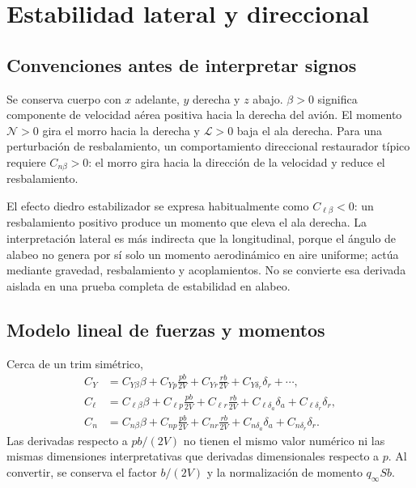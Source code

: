 \chapter{Estabilidad lateral y direccional}\label{ch:lat-static}

\section{Convenciones antes de interpretar signos}
Se conserva cuerpo con $x$ adelante, $y$ derecha y $z$ abajo. $\beta>0$ significa componente de velocidad aérea positiva hacia la derecha del avión. El momento $\mathcal N>0$ gira el morro hacia la derecha y $\mathcal L>0$ baja el ala derecha. Para una perturbación de resbalamiento, un comportamiento direccional restaurador típico requiere $C_{n\beta}>0$: el morro gira hacia la dirección de la velocidad y reduce el resbalamiento.

El efecto diedro estabilizador se expresa habitualmente como $C_{\ell\beta}<0$: un resbalamiento positivo produce un momento que eleva el ala derecha. La interpretación lateral es más indirecta que la longitudinal, porque el ángulo de alabeo no genera por sí solo un momento aerodinámico en aire uniforme; actúa mediante gravedad, resbalamiento y acoplamientos. No se convierte esa derivada aislada en una prueba completa de estabilidad en alabeo.

\section{Modelo lineal de fuerzas y momentos}
Cerca de un trim simétrico,
\begin{align}
C_Y&=C_{Y\beta}\beta+C_{Yp}\frac{pb}{2V}+C_{Yr}\frac{rb}{2V}+C_{Y\delta_r}\delta_r+\cdots,\\
C_\ell&=C_{\ell\beta}\beta+C_{\ell p}\frac{pb}{2V}+C_{\ell r}\frac{rb}{2V}
+C_{\ell\delta_a}\delta_a+C_{\ell\delta_r}\delta_r,\\
C_n&=C_{n\beta}\beta+C_{np}\frac{pb}{2V}+C_{nr}\frac{rb}{2V}
+C_{n\delta_a}\delta_a+C_{n\delta_r}\delta_r.
\end{align}
Las derivadas respecto a $pb/(2V)$ no tienen el mismo valor numérico ni las mismas dimensiones interpretativas que derivadas dimensionales respecto a $p$. Al convertir, se conserva el factor $b/(2V)$ y la normalización de momento $q_\infty Sb$.

